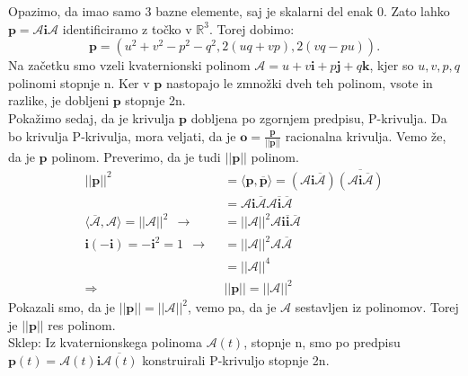 \documentclass[mat1]{fmfdelo}
\newcommand{\R}{\mathbb R}
\newcommand{\ii}{\boldsymbol i}
\newcommand{\jj}{\boldsymbol j}
\newcommand{\kk}{\boldsymbol k}
\newcommand{\pp}{\boldsymbol p}
\newcommand{\A}{\mathcal A}
\begin{document}
Opazimo, da imao samo 3 bazne elemente, saj je skalarni del enak 0. Zato lahko $\pp = \A\ii\A$ identificiramo z točko v $\R^3$. Torej dobimo:
\begin{equation*}
\pp = (u^2+v^2-p^2-q^2, 2(uq+vp),2(vq-pu)).
\end{equation*}
Na začetku smo vzeli kvaternionski polinom $\A=u+v\ii+p\jj+q\kk$, kjer so $u,v,p,q$ polinomi stopnje n. Ker v $\pp$ nastopajo le zmnožki dveh teh polinom, vsote in razlike, je dobljeni $\pp$ stopnje 2n.\\
Pokažimo sedaj, da je krivulja $\pp$ dobljena po zgornjem predpisu, P-krivulja. Da bo krivulja P-krivulja, mora veljati, da je $\boldsymbol{o} = \frac{\pp}{||\pp||}$ racionalna krivulja. Vemo že, da je $\pp$ polinom. Preverimo, da je tudi $||\pp||$ polinom.
\begin{equation*}
\begin{split}
||\pp||^2 &= \langle \pp,\overline{\pp}\rangle = (\A\ii\overline{\A})\overline{(\A\ii\overline{\A})} \\
&= \A\ii\overline{\A}\A\overline{\ii} \overline{\A} \\
\langle \overline{\A}, \A \rangle = ||\A||^2 ~~ \longrightarrow ~~& = ||\A||^2 \A \ii \overline{\ii} \overline{\A} \\
\ii(-\ii) = -\ii^2 = 1 ~~ \longrightarrow ~~ & = ||\A||^2 \A \overline{\A} \\
&=||\A||^4 \\
\Longrightarrow ~~~~ & ||\pp|| = ||\A||^2
\end{split}
\end{equation*}
Pokazali smo, da je $||\pp|| = ||\A||^2$, vemo pa, da je $\A$ sestavljen iz polinomov. Torej je $||\pp||$ res polinom.\\

Sklep: Iz kvaternionskega polinoma $\A(t)$, stopnje n, smo po predpisu\\ $\pp(t) = \A(t)\ii\overline{\A(t)}$ konstruirali P-krivuljo stopnje 2n. 
\end{document}
